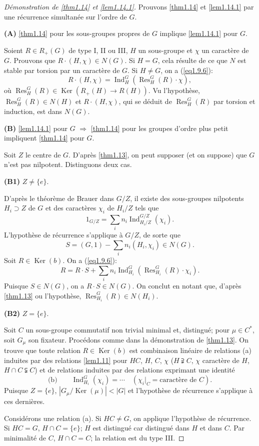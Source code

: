 \documentclass[11pt,a4paper]{amsart}
\theoremstyle{plain}
\theoremstyle{definition}
\DeclareMathOperator{\Ind}{Ind}
\DeclareMathOperator{\Res}{Res}
\DeclareMathOperator{\Ker}{Ker}
\begin{document}
\begin{proof}[D\'emonstration de \ref{thm1.14} et \ref{lem1.14.1}]
Prouvons \ref{thm1.14} et \ref{lem1.14.1} par une r\'ecurrence simultan\'ee sur l'ordre de $G$.

\medskip
\noindent
\textbf{(A)} \ref{thm1.14} pour les sous-groupes propres de $G$ implique \ref{lem1.14.1} pour $G$.

Soient $R \in R_{+}(G)$ de type I, II ou III, $H$ un sous-groupe et $\chi$ un caract\`ere de $G$. Prouvons que $R \cdot (H,\chi) \in N(G)$. Si $H = G$, cela r\'esulte de ce que $N$ est stable par torsion par un caract\`ere de $G$. Si $H \not= G$, on a (\ref{eq1.9.6}):
\[
R \cdot (H,\chi) = \Ind_{H}^{G}(\Res_{H}^{G}(R) \cdot \chi),
\]
o\`u $\Res_{H}^{G}(R) \in \Ker(R_{+}(H) \longrightarrow R(H))$. Vu l'hypoth\`ese, $\Res_{H}^{G}(R) \in N(H)$ et $R \cdot (H,\chi)$, qui se d\'eduit de $\Res_{H}^{G}(R)$ par torsion et induction, est dans $N(G)$.

\medskip
\noindent
\textbf{(B)} \ref{lem1.14.1} pour $G$ $\Rightarrow$ \ref{thm1.14} pour les groupes d'ordre plus petit impliquent \ref{thm1.14} pour $G$.

Soit $Z$ le centre de $G$. D'apr\`es \ref{thm1.13}, on peut supposer (et on suppose) que $G$ n'est pas nilpotent. Distinguons deux cas.

\medskip
\noindent
\textbf{(B1)} $Z \not= \{e\}$.

D'apr\`es le th\'eor\`eme de Brauer dans $G/Z$, il existe des sous-groupes nilpotents $H_{i} \supset Z$ de $G$ et des caract\`eres $\chi_{i}$ de $H_{i}/Z$ tels que
\[
1_{G/Z} = \sum_{i} n_{i} \Ind_{H_{i}/Z}^{G/Z}(\chi_{i}).
\]
L'hypoth\`ese de r\'ecurrence s'applique \`a $G/Z$, de sorte que
\[
S = (G,1) - \sum_{i} n_{i}(H_{i},\chi_{i}) \in N(G).
\]
Soit $R \in \Ker(b)$. On a (\ref{eq1.9.6}):
\[
R = R \cdot S + \sum_{i} n_{i} \Ind_{H_{i}}^{G}(\Res_{H_{i}}^{G}(R) \cdot \chi_{i}).
\]
Puisque $S \in N(G)$, on a $R \cdot S \in N(G)$. On conclut en notant que, d'apr\`es \ref{thm1.13} ou l'hypoth\`ese, $\Res_{H_{i}}^{G}(R) \in N(H_{i})$.

\medskip
\noindent
\textbf{(B2)} $Z = \{e\}$.

Soit $C$ un sous-groupe commutatif non trivial minimal et, distingu\'e; pour $\mu \in C^{*}$, soit $G_{\mu}$ son fixateur. Proc\'edons comme dans la d\'emonstration de \ref{thm1.13}. On trouve que toute relation $R \in \Ker(b)$ est combinaison lin\'eaire de relations (a) induites par des relations \ref{lem1.11} pour $HC$, $H$, $C$, $\chi$ ($H \supsetneqq C$, $\chi$ caract\`ere de $H$, $H \cap C \subsetneqq C$) et de relations induites par des relations exprimant une identit\'e
\[
\text{(b)} \qquad \Ind_{H_{i}}^{G}(\chi_{i}) = \cdots \quad (\chi_{i}|_{C} = \text{caract\`ere de } C).
\]
Puisque $Z = \{e\}$, $|G_{\mu}/\Ker(\mu)| < |G|$ et l'hypoth\`ese de r\'ecurrence s'applique \`a ces derni\`eres.

Consid\'erons une relation (a). Si $HC \not= G$, on applique l'hypoth\`ese de r\'ecurrence. Si $HC = G$, $H \cap C = \{e\}$; $H$ est distingu\'e car distingu\'e dans $H$ et dans $C$. Par minimalit\'e de $C$, $H \cap C = C$; la relation est du type III.
\end{proof}
\end{document}
